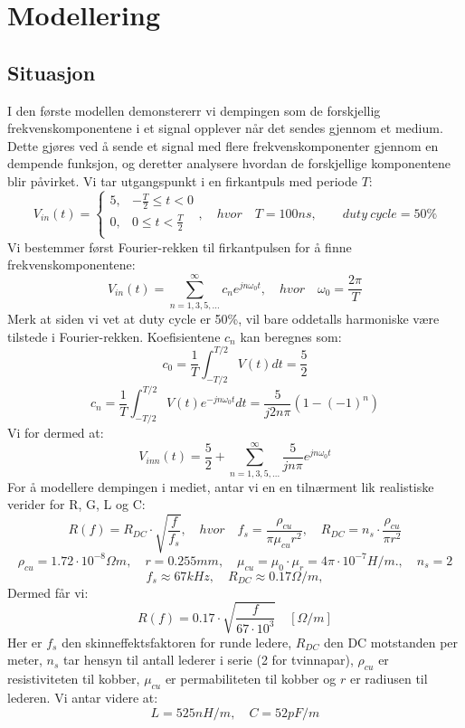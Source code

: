 \section{Modellering}
\subsection{Situasjon}
I den første modellen demonstererr vi dempingen som de forskjellig frekvenskomponentene i et signal opplever når det sendes gjennom et medium. Dette gjøres ved å sende et signal med flere frekvenskomponenter gjennom en dempende funksjon, og deretter analysere hvordan de forskjellige komponentene blir påvirket.
Vi tar utgangspunkt i en firkantpuls med periode $T$:
\[
    V_{in}(t) = \begin{cases}
        5, & -\frac{T}{2} \leq t < 0 \\
        0, & 0 \leq t < \frac{T}{2} \\
    \end{cases}, \quad hvor \quad T = 100ns,\qquad duty\ cycle = 50\%
\]
Vi bestemmer først Fourier-rekken til firkantpulsen for å finne frekvenskomponentene:
\[
    V_{in}(t) = \sum_{n=1,3,5,...}^{\infty} c_n e^{j n \omega_0 t}, \quad hvor \quad \omega_0 = \frac{2\pi}{T}
\]
Merk at siden vi vet at duty cycle er 50\%, vil bare oddetalls harmoniske være tilstede i Fourier-rekken.
Koefisientene $c_n$ kan beregnes som:
\[
    c_0 = \frac{1}{T} \int_{-T/2}^{T/2} V(t) dt = \frac{5}{2}
\]
\[
    c_n = \frac{1}{T} \int_{-T/2}^{T/2} V(t) e^{-j n \omega_0 t} dt =  \frac{5}{j 2 n \pi} (1 - (-1)^n)
\]
Vi for dermed at:
\[
    V_{inn}(t) = \frac{5}{2} + \sum_{n=1,3,5,...}^{\infty} \frac{5}{j n \pi} e^{j n \omega_0 t}
\]
For å modellere dempingen i mediet, antar vi en en tilnærment lik realistiske verider for R, G, L og C:
\[
    R(f) = R_{DC} \cdot \sqrt{\frac{f}{f_{s}}}, \quad hvor \quad f_{s} = \frac{\rho_{cu}}{\pi \mu_{cu} r^2}, \quad R_{DC} = n_s \cdot \frac{\rho_{cu}}{\pi r^2}
\]
\[
    \rho_{cu} = 1.72 \cdot 10^{-8} \Omega m, \quad r = 0.255 mm, \quad \mu_{cu} = \mu_0 \cdot \mu_r = 4\pi \cdot 10^{-7} H/m., \quad n_s = 2
\]
\[
    f_s \approx 67kHz, \quad R_{DC} \approx 0.17 \Omega/m,
\]
Dermed får vi:
\[
    R(f) = 0.17 \cdot \sqrt{\frac{f}{67 \cdot 10^3}} \quad [\Omega/m]
\]
Her er $f_s$ den skinneffektsfaktoren for runde ledere, $R_{DC}$ den DC motstanden per meter, $n_s$ tar hensyn til antall lederer i serie (2 for tvinnapar), $\rho_{cu}$ er resistiviteten til kobber, $\mu_{cu}$ er permabiliteten til kobber og $r$ er radiusen til lederen.
Vi antar videre at:
\[
    L = 525 nH/m, \quad C = 52 pF/m
\]

